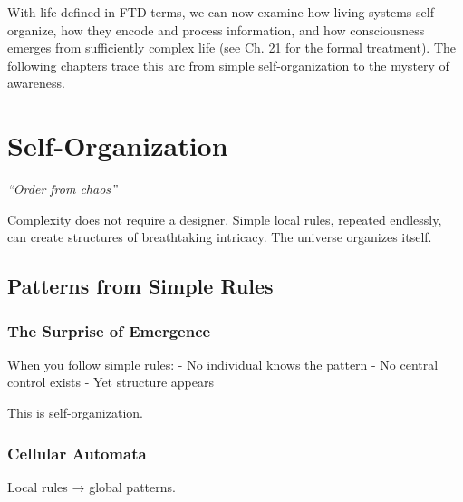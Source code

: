 \documentclass[
  11pt,
  letterpaper,
  twoside,
  openright]{book}
\begin{document}
With life defined in FTD terms, we can now examine how living systems
self-organize, how they encode and process information, and how
consciousness emerges from sufficiently complex life (see Ch. 21 for the
formal treatment). The following chapters trace this arc from simple
self-organization to the mystery of awareness.

\chapter{Self-Organization}\label{sec-self-organization}

\emph{``Order from chaos''}

\begin{tcolorbox}[enhanced jigsaw, coltitle=black, colbacktitle=quarto-callout-note-color!10!white, toprule=.15mm, colframe=quarto-callout-note-color-frame, arc=.35mm, opacityback=0, bottomtitle=1mm, toptitle=1mm, breakable, colback=white, titlerule=0mm, opacitybacktitle=0.6, title=\textcolor{quarto-callout-note-color}{\faInfo}\hspace{0.5em}{Key Revelation}, rightrule=.15mm, bottomrule=.15mm, leftrule=.75mm, left=2mm]

Complexity does not require a designer. Simple local rules, repeated
endlessly, can create structures of breathtaking intricacy. The universe
organizes itself.

\end{tcolorbox}

\section{Patterns from Simple Rules}\label{patterns-from-simple-rules}

\subsection{The Surprise of Emergence}\label{the-surprise-of-emergence}

When you follow simple rules: - No individual knows the pattern - No
central control exists - Yet structure appears

This is self-organization.

\subsection{Cellular Automata}\label{cellular-automata}

Local rules → global patterns.
\end{document}
